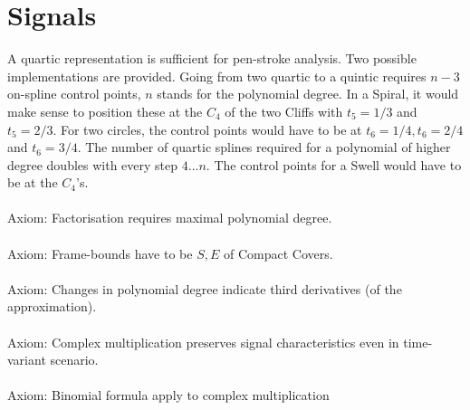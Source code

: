 \documentclass[a4paper,portrait]{report}
\begin{document}
\chapter{Signals}
A quartic representation is sufficient for pen-stroke analysis. Two possible implementations are provided. Going from two quartic to a quintic requires $n-3$ on-spline control points, $n$ stands for the polynomial degree. In a Spiral, it would make sense to position these at the $C_{4}$ of the two Cliffs with $t_{5}=1/3$ and $t_{5}=2/3$. For two circles, the control points would have to be at $t_{6}=1/4,t_{6}=2/4$ and $t_{6}=3/4$. The number of quartic splines required for a polynomial of higher degree doubles with every step $4...n$. The control points for a Swell would have to be at the $C_{4}$'s.\\\\
Axiom: Factorisation requires maximal polynomial degree.\\\\
Axiom: Frame-bounds have to be $S,E$ of Compact Covers.\\\\
Axiom: Changes in polynomial degree indicate third derivatives (of the approximation).\\\\
Axiom: Complex multiplication preserves signal characteristics even in time-variant scenario.\\\\
Axiom: Binomial formula apply to complex multiplication\\\\
\iffalse
\printbibliography
\fi
{}

\end{document}
